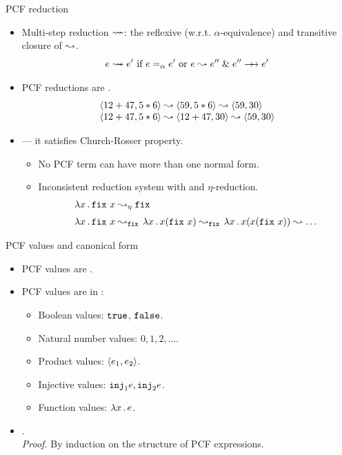 \documentclass[paper=screen,mode=present,style=zysimple]{powerdot}
\begin{document}
\begin{slide}{PCF reduction}
\begin{itemize}
\item Multi-step reduction $\reduceto$: the reflexive (w.r.t. $\alpha$-equivalence) 
and transitive closure of $\leadsto$. 
\vspace*{-0.5em}
\[
e \reduceto e' \mbox{ if } e =_\alpha e' \mbox{ or } e \reduce e'' \;\&\; e'' \Reduce e'
\vspace*{-2.5em}
\]
\item PCF reductions are . 
\vspace*{-0.5em}
\[
\begin{array}{l}
\cpair{12 + 47, 5 * 6} \reduce \cpair{59, 5 * 6} \reduce \cpair{59, 30}
\\
\cpair{12 + 47, 5 * 6} \reduce \cpair{12 + 47 , 30} \reduce \cpair{59, 30}
\end{array}
\vspace*{-2em}
\]
\item {} --- it satisfies Church-Rosser property.
\begin{itemize}
\item No PCF term can have more than one normal form.
\item Inconsistent reduction system with  and $\eta$-reduction.
\[
\begin{array}{l}
\lambda x \, . \, \mathtt{fix}\, \, x \leadsto_\eta \mathtt{fix}\,  \\[0.6em]
\lambda x \, . \, \mathtt{fix}\, \, x \leadsto_{\mathtt{fix}\,} \lambda x \, . \, x (\mathtt{fix}\, \, x) 
\leadsto_{\mathtt{fix}\,} \lambda x \, . \, x ( x (\mathtt{fix}\, \, x)) \leadsto \ldots
\end{array}
\]
\end{itemize}
\end{itemize}
\end{slide}

\begin{slide}{PCF values and canonical form}
\begin{itemize}
\item PCF values are . 
\item PCF values are in :
\begin{itemize}
\item Boolean values: $\mathtt{true}$, $\mathtt{false}$.
\item Natural number values: $0, 1, 2, \ldots$. 
\item Product values: $\langle{e_1, e_2}\rangle$.
\item Injective values: $\mathtt{inj}_1 e, \mathtt{inj}_2 e$.
\item Function values: $\lambda x \, . \, e$.
\end{itemize}
\item {}. \\[0.3em]
{\em Proof.} By induction on the structure of PCF expressions.
\end{itemize}
\end{slide}
\end{document}
